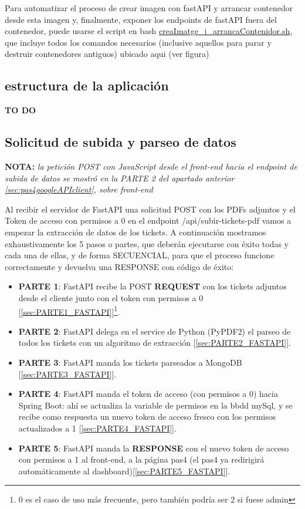 \documentclass[a4paper,12pt]{report}
\begin{document}
	Para automatizar el proceso de crear imagen con fastAPI y arrancar contenedor desde esta imagen y, finalmente, exponer los endpoints de fastAPI fuera del contenedor, puede usarse el script en bash \href{https://github.com/blackcub3s/mercApp/blob/main/APP%20WEB/__FastAPI__/creaImatge_i_arrancaContenidor.sh}{creaImatge\_i\_arrancaContenidor.sh}, que incluye todos los comandos necesarios (inclusive aquellos para parar y destruir contenedores antiguos) ubicado aqui (ver figura)
	
	\subsection{estructura de la aplicación}
	
	\textbf{TO DO}
	
	\subsection{Solicitud de subida y parseo de datos}
	\label{sec:solicitudDeExtraccion}
	
	
	\textbf{NOTA:} \textit{la petición POST con JavaScript desde el front-end hacia el endpoint de subida de datos se mostró en la PARTE 2 del apartado anterior \ref{sec:pas4googleAPIclient}, sobre front-end}
	
	Al recibir el servidor de FastAPI una solicitud POST con los PDFs adjuntos y el Token de acceso con permisos a 0 en el endpoint /api/subir-tickets-pdf vamos a empezar la extracción de datos de los tickets. A continuación mostramos exhaustivamente los 5 pasos o partes, que deberán ejecutarse con éxito todas y cada una de ellas, y de forma SECUENCIAL, para que el proceso funcione correctamente y devuelva una RESPONSE con código de éxito:
	
	\begin{itemize}
	\setlength{\itemsep}{-.3em}
		\item \textbf{PARTE 1}: FastAPI recibe la POST \textbf{REQUEST} con los tickets adjuntos desde el cliente junto con el token con permisos a 0 [\ref{sec:PARTE1_FASTAPI}]\footnote{0 es el caso de uso más frecuente, pero también podría ser 2 si fuese admin}.
		\item \textbf{PARTE 2}: FastAPI delega en el service de Python (PyPDF2) el parseo de todos los tickets con un algoritmo de extracción [\ref{sec:PARTE2_FASTAPI}].
		\item \textbf{PARTE 3}: FastAPI manda los tickets parseados a MongoDB [\ref{sec:PARTE3_FASTAPI}].
		\item \textbf{PARTE 4}: FastAPI manda el token de acceso (con permisos a 0) hacia Spring Boot: ahí se actualiza la variable de permisos en la bbdd mySql, y se recibe como respuesta un nuevo token de acceso fresco con los permisos actualizados a 1 [\ref{sec:PARTE4_FASTAPI}].
		\item \textbf{PARTE 5}: FastAPI manda la \textbf{RESPONSE} con el nuevo token de acceso con permisos a 1 al front-end, a la página pas4 (el pas4 ya redirigirá automáticamente al dashboard)[\ref{sec:PARTE5_FASTAPI}].
	\end{itemize}
\end{document}
